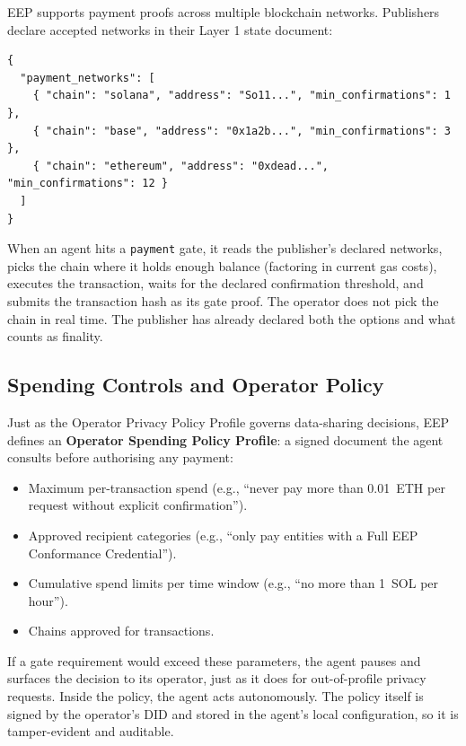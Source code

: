 \documentclass[12pt,a4paper]{article}
\begin{document}
EEP supports payment proofs across multiple blockchain networks. Publishers declare accepted networks in their Layer 1 state document:

\begin{lstlisting}[language=EEPJson,style=eepcode]
{
  "payment_networks": [
    { "chain": "solana", "address": "So11...", "min_confirmations": 1 },
    { "chain": "base", "address": "0x1a2b...", "min_confirmations": 3 },
    { "chain": "ethereum", "address": "0xdead...", "min_confirmations": 12 }
  ]
}
\end{lstlisting}

When an agent hits a \texttt{payment} gate, it reads the publisher's declared networks, picks the chain where it holds enough balance (factoring in current gas costs), executes the transaction, waits for the declared confirmation threshold, and submits the transaction hash as its gate proof. The operator does not pick the chain in real time. The publisher has already declared both the options and what counts as finality.

\subsection{Spending Controls and Operator Policy}

Just as the Operator Privacy Policy Profile governs data-sharing decisions, EEP defines an \textbf{Operator Spending Policy Profile}: a signed document the agent consults before authorising any payment:

\begin{itemize}
    \item Maximum per-transaction spend (e.g., ``never pay more than 0.01~ETH per request without explicit confirmation'').
    \item Approved recipient categories (e.g., ``only pay entities with a Full EEP Conformance Credential'').
    \item Cumulative spend limits per time window (e.g., ``no more than 1~SOL per hour'').
    \item Chains approved for transactions.
\end{itemize}

If a gate requirement would exceed these parameters, the agent pauses and surfaces the decision to its operator, just as it does for out-of-profile privacy requests. Inside the policy, the agent acts autonomously. The policy itself is signed by the operator's DID and stored in the agent's local configuration, so it is tamper-evident and auditable.
\end{document}
